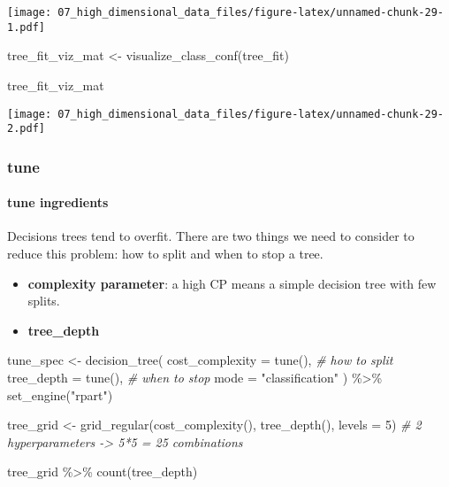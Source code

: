 \documentclass[
]{book}
\newenvironment{Shaded}{\begin{snugshade}}{\end{snugshade}}
\newcommand{\AttributeTok}[1]{\textcolor[rgb]{0.77,0.63,0.00}{#1}}
\newcommand{\CommentTok}[1]{\textcolor[rgb]{0.56,0.35,0.01}{\textit{#1}}}
\newcommand{\DecValTok}[1]{\textcolor[rgb]{0.00,0.00,0.81}{#1}}
\newcommand{\FunctionTok}[1]{\textcolor[rgb]{0.00,0.00,0.00}{#1}}
\newcommand{\NormalTok}[1]{#1}
\newcommand{\OtherTok}[1]{\textcolor[rgb]{0.56,0.35,0.01}{#1}}
\newcommand{\SpecialCharTok}[1]{\textcolor[rgb]{0.00,0.00,0.00}{#1}}
\newcommand{\StringTok}[1]{\textcolor[rgb]{0.31,0.60,0.02}{#1}}
\begin{document}
\texttt{[image: 07\_high\_dimensional\_data\_files/figure-latex/unnamed-chunk-29-1.pdf]}

\begin{Shaded}
\begin{Highlighting}[]
\NormalTok{tree\_fit\_viz\_mat }\OtherTok{\textless{}{-}} \FunctionTok{visualize\_class\_conf}\NormalTok{(tree\_fit)}

\NormalTok{tree\_fit\_viz\_mat}
\end{Highlighting}
\end{Shaded}

\texttt{[image: 07\_high\_dimensional\_data\_files/figure-latex/unnamed-chunk-29-2.pdf]}

\hypertarget{tune-1}{%
\subsubsection{tune}\label{tune-1}}

\hypertarget{tune-ingredients-1}{%
\paragraph{tune ingredients}\label{tune-ingredients-1}}

Decisions trees tend to overfit. There are two things we need to consider to reduce this problem: how to split and when to stop a tree.

\begin{itemize}
\item
  \textbf{complexity parameter}: a high CP means a simple decision tree with few splits.
\item
  \textbf{tree\_depth}
\end{itemize}

\begin{Shaded}
\begin{Highlighting}[]
\NormalTok{tune\_spec }\OtherTok{\textless{}{-}} \FunctionTok{decision\_tree}\NormalTok{(}
    \AttributeTok{cost\_complexity =} \FunctionTok{tune}\NormalTok{(), }\CommentTok{\# how to split }
    \AttributeTok{tree\_depth =} \FunctionTok{tune}\NormalTok{(), }\CommentTok{\# when to stop }
    \AttributeTok{mode =} \StringTok{"classification"}
\NormalTok{  ) }\SpecialCharTok{\%\textgreater{}\%}
  \FunctionTok{set\_engine}\NormalTok{(}\StringTok{"rpart"}\NormalTok{)}

\NormalTok{tree\_grid }\OtherTok{\textless{}{-}} \FunctionTok{grid\_regular}\NormalTok{(}\FunctionTok{cost\_complexity}\NormalTok{(),}
                          \FunctionTok{tree\_depth}\NormalTok{(),}
                          \AttributeTok{levels =} \DecValTok{5}\NormalTok{) }\CommentTok{\# 2 hyperparameters {-}\textgreater{} 5*5 = 25 combinations }

\NormalTok{tree\_grid }\SpecialCharTok{\%\textgreater{}\%}
  \FunctionTok{count}\NormalTok{(tree\_depth)}
\end{Highlighting}
\end{Shaded}
\end{document}
